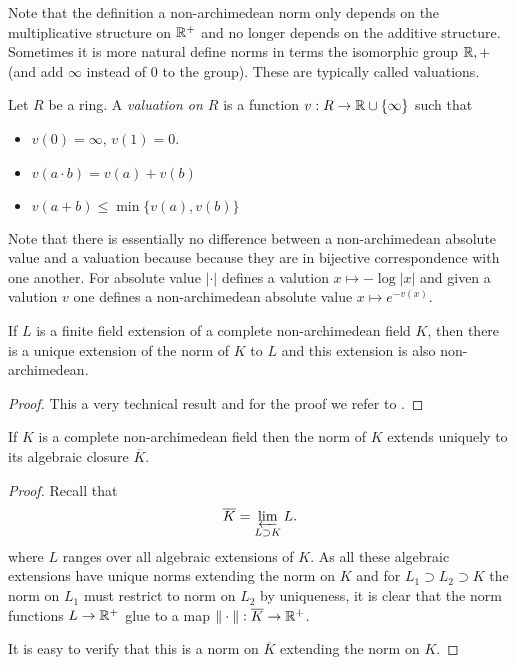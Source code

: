 Note that the definition a non-archimedean norm only depends on the multiplicative structure on $\mathbb{R}^{+}$ and no longer depends on the additive structure. 
Sometimes it is more natural define norms in terms the isomorphic group $\mathbb{R}, +$ (and add $\infty$ instead of $0$ to the group). 
These are typically called valuations. 


\begin{definition}
	Let $R$ be a ring. A \emph{valuation on $R$} is a function $v:R \to \mathbb{R} \cup \{\infty\} $ such that 	
	\begin{itemize}
		\item $v(0) = \infty$, $v(1) = 0$. 
		\item $v(a\cdot b) = v(a) + v(b)$
		\item $v(a + b) \le \min\{v(a), v(b)\}$
	\end{itemize}
\end{definition}

\begin{remark}
	Note that there is essentially no difference between a non-archimedean absolute value and a valuation because because they are in bijective correspondence with one another.  For absolute value $|\cdot |$ defines a valution $x \mapsto -\log |x|$ and given a valution $v$ one defines a non-archimedean absolute value $x\mapsto e^{- v(x)}$. 
\end{remark}





\begin{theorem}\label{thm:norm_finite_field_ext}
	If $L$ is a finite field extension of a complete non-archimedean field $K$, then there is a unique extension of the norm of $K$ to $L$ and this extension is also non-archimedean.
\end{theorem}
\begin{proof}
	This a very technical result and for the proof we refer to \cite[][appendix A]{boschLecturesFormalRigid2014}. 
\end{proof}

\begin{corollary}
	If $K$ is a complete non-archimedean field then the norm of  $K$ extends uniquely to its algebraic closure $\overline{K}$.
\end{corollary}
\begin{proof}
	Recall that \[
	\overline{K} = \varprojlim_{L \supset K} L
	.\] 
	where $L$ ranges over all algebraic extensions of $K$. 
	As all these algebraic extensions have unique norms extending  the norm on $K$ and for $L_1 \supset L_2 \supset K$ the norm on  $L_1$ must restrict to norm on $L_2$ by uniqueness, it is clear that the norm functions $L \to \mathbb{R}^{+}$ glue to a map $\|\cdot \|: \overline{K} \to \mathbb{R}^{+}$. 

	It is easy to verify that this is a norm on $\overline{K}$ extending the norm on $K$. 
\end{proof}

